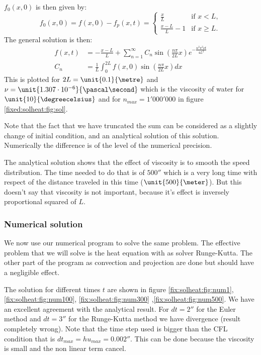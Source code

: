 $f_{0}(x,0)$ is then given by:
\begin{equation}
  f_{0}(x,0)=f(x,0)-f_{p}(x,t)=\begin{cases}
                               	\frac{x}{L}&\text{if $x<L$},\\
                               	\frac{x-L}{L}-1&\text{if $x\geq L$.}
                               \end{cases}
\end{equation}
The general solution is then:
\begin{align}
  f(x,t)&=-\frac{x-L}{L}+\sum_{n=1}^{\infty}C_{n}\sin\left(\frac{n\pi}{2L}x\right)e^{-\frac{n^2\pi^2\nu t}{4L^2}}\\
  C_{n}&=\frac{1}{L}\int_{0}^{2L}f(x,0)\sin\left(\frac{n\pi}{2L}x\right) dx
\end{align}
This is plotted for $2L=\unit{0.1}{\metre}$ and $\nu=\unit{1.307\cdot 10^{-6}}{\pascal\second}$ which is the viscosity of water for $\unit{10}{\degreecelsius}$ and for $n_{max}=1'000'000$ in figure \ref{fixed:solheat:fig:sol}.

Note that the fact that we have truncated the sum can be considered as a slightly change of initial condition, and an analytical solution of this solution.
Numerically the difference is of the level of the numerical precision.

The analytical solution shows that the effect of viscosity is to smooth the speed distribution. The time needed to do that is of $\unit{500}{\second}$
which is a very long time with respect of the distance traveled in this time ($\unit{500}{\meter}$).
But this doesn't say that viscosity is not important, because it's effect is inversely proportional squared of $L$.


\subsubsection{Numerical solution}

We now use our numerical program to solve the same problem. The effective problem that we will solve is the heat equation with as solver Runge-Kutta.
The other part of the program as convection and projection are done but should have a negligible effect.

The solution for different times $t$ are shown in figure \ref{fix:solheat:fig:num1}, \ref{fix:solheat:fig:num100}, \ref{fix:solheat:fig:num300} ,\ref{fix:solheat:fig:num500}. We have an excellent agreement with the analytical result.
For $dt=2\second$ for the Euler method and $dt=\unit{3}{\second}$ for the Runge-Kutta method we have divergence (result completely wrong).
Note that the time step used is bigger than the CFL condition that is $dt_{max}=hu_{max}=\unit{0.002}{\second}$. This can be done because the viscosity is small and the non linear term cancel.

